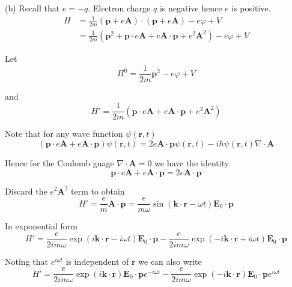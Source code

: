 (b) Recall that $e=-q$. Electron charge $q$ is negative hence $e$ is positive.
\begin{align*}
H&=\frac{1}{2m}(\mathbf p+e\mathbf A)\cdot(\mathbf p+e\mathbf A)-e\varphi+V
\\[1ex]
&=\frac{1}{2m}\left(\mathbf p^2+\mathbf p\cdot e\mathbf A+e\mathbf A\cdot\mathbf p+e^2\mathbf A^2\right)
-e\varphi+V
\end{align*}

Let
\begin{equation*}
H^0=\frac{1}{2m}\mathbf p^2-e\varphi+V
\end{equation*}

and
\begin{equation*}
H'=\frac{1}{2m}\left(\mathbf p\cdot e\mathbf A+e\mathbf A\cdot\mathbf p+e^2\mathbf A^2\right)
\end{equation*}

Note that for any wave function $\psi(\mathbf r,t)$
\begin{equation*}
(\mathbf p\cdot e\mathbf A+e\mathbf A\cdot\mathbf p)\psi(\mathbf r,t)
=2e\mathbf A\cdot\mathbf p\psi(\mathbf r,t)-i\hbar\psi(\mathbf r,t)\nabla\cdot\mathbf A
\end{equation*}

Hence for the Coulomb guage $\nabla\cdot\mathbf A=0$ we have the identity
\begin{equation*}
\mathbf p\cdot e\mathbf A+e\mathbf A\cdot\mathbf p=2e\mathbf A\cdot\mathbf p
\end{equation*}

Discard the $e^2\mathbf A^2$ term to obtain
\begin{equation*}
H'=\frac{e}{m}\mathbf A\cdot\mathbf p
=\frac{e}{m\omega}\sin(\mathbf k\cdot\mathbf r-\omega t)\mathbf E_0\cdot\mathbf p
\end{equation*}

In exponential form
\begin{equation*}
H'=\frac{e}{2im\omega}\exp(i\mathbf k\cdot\mathbf r-i\omega t)\mathbf E_0\cdot\mathbf p
-\frac{e}{2im\omega}\exp(-i\mathbf k\cdot\mathbf r+i\omega t)\mathbf E_0\cdot\mathbf p
\end{equation*}

Noting that $e^{i\omega t}$ is independent of $\mathbf r$ we can also write
\begin{equation*}
H'=\frac{e}{2im\omega}\exp(i\mathbf k\cdot\mathbf r)\mathbf E_0\cdot\mathbf pe^{-i\omega t}
-\frac{e}{2im\omega}\exp(-i\mathbf k\cdot\mathbf r)\mathbf E_0\cdot\mathbf pe^{i\omega t}
\end{equation*}

